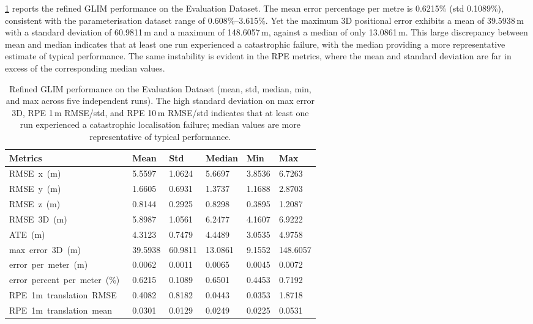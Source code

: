 \cref{tab:eval_refined_performance} reports the refined GLIM performance on the Evaluation Dataset. The mean error percentage per metre is 0.6215\% (std 0.1089\%), consistent with the parameterisation dataset range of 0.608\%--3.615\%. Yet the maximum 3D positional error exhibits a mean of 39.5938\,m with a standard deviation of 60.9811\,m and a maximum of 148.6057\,m, against a median of only 13.0861\,m. This large discrepancy between mean and median indicates that at least one run experienced a catastrophic failure, with the median providing a more representative estimate of typical performance. The same instability is evident in the RPE metrics, where the mean and standard deviation are far in excess of the corresponding median values.

\begin{table}[htbp]
\centering
\caption{Refined GLIM performance on the Evaluation Dataset (mean, std, median, min, and max across five independent runs). The high standard deviation on max error 3D, RPE 1\,m RMSE/std, and RPE 10\,m RMSE/std indicates that at least one run experienced a catastrophic localisation failure; median values are more representative of typical performance.}
\label{tab:eval_refined_performance}
\begin{tabularx}{\textwidth}{lXXXXX}
\toprule
\textbf{Metrics} & \textbf{Mean} & \textbf{Std} & \textbf{Median} & \textbf{Min} & \textbf{Max} \\ \midrule
RMSE\ x\ (m)\        & 5.5597  & 1.0624  & 5.6697  & 3.8536 & 6.7263   \\
RMSE\ y\ (m)\        & 1.6605  & 0.6931  & 1.3737  & 1.1688 & 2.8703   \\
RMSE\ z\ (m)\        & 0.8144  & 0.2925  & 0.8298  & 0.3895 & 1.2087   \\
RMSE\ 3D\ (m)\       & 5.8987  & 1.0561  & 6.2477  & 4.1607 & 6.9222   \\
ATE\ (m)\            & 4.3123  & 0.7479  & 4.4489  & 3.0535 & 4.9758   \\
max\ error\ 3D\ (m)\ & 39.5938 & 60.9811 & 13.0861 & 9.1552 & 148.6057 \\
error\ per\ meter\ (m)\        & 0.0062 & 0.0011 & 0.0065 & 0.0045 & 0.0072 \\
error\ percent\ per\ meter\ (\%)\ & 0.6215 & 0.1089 & 0.6501 & 0.4453 & 0.7192 \\
RPE\ 1m\ translation\ RMSE\  & 0.4082  & 0.8182  & 0.0443  & 0.0353 & 1.8718   \\
RPE\ 1m\ translation\ mean\  & 0.0301  & 0.0129  & 0.0249  & 0.0225 & 0.0531   \\

\end{tabularx}
\end{table}
